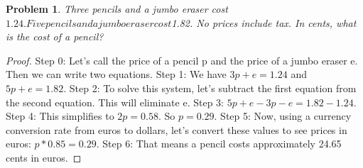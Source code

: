 \documentclass{article}
\newtheorem{theorem}{Problem}
\begin{document}
\begin{theorem}
Three pencils and a jumbo eraser cost $1.24. Five pencils and a jumbo eraser cost $1.82. No prices include tax. In cents, what is the cost of a pencil?
\end{theorem}

\begin{proof}
Step 0: Let's call the price of a pencil p and the price of a jumbo eraser e. Then we can write two equations.
Step 1: We have $3p+e=1.24$ and $5p+e=1.82$.
Step 2: To solve this system, let's subtract the first equation from the second equation. This will eliminate e.
Step 3: $5p+e-3p-e=1.82-1.24$.
Step 4: This simplifies to $2p=0.58$. So $p=0.29$.
Step 5: Now, using a currency conversion rate from euros to dollars, let's convert these values to see prices in euros: $p*0.85=0.29$.
Step 6: That means a pencil costs approximately 24.65 cents in euros.
\end{proof}
\end{document}
